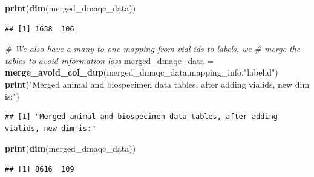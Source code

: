 \documentclass[]{article}
\newenvironment{Shaded}{\begin{snugshade}}{\end{snugshade}}
\newcommand{\KeywordTok}[1]{\textcolor[rgb]{0.13,0.29,0.53}{\textbf{#1}}}
\newcommand{\StringTok}[1]{\textcolor[rgb]{0.31,0.60,0.02}{#1}}
\newcommand{\CommentTok}[1]{\textcolor[rgb]{0.56,0.35,0.01}{\textit{#1}}}
\newcommand{\NormalTok}[1]{#1}
\begin{document}
\begin{Shaded}
\begin{Highlighting}[]
\KeywordTok{print}\NormalTok{(}\KeywordTok{dim}\NormalTok{(merged_dmaqc_data))}
\end{Highlighting}
\end{Shaded}

\begin{verbatim}
## [1] 1638  106
\end{verbatim}

\begin{Shaded}
\begin{Highlighting}[]
\CommentTok{# We also have a many to one mapping from vial ids to labels, we }
\CommentTok{# merge the tables to avoid information loss}
\NormalTok{merged_dmaqc_data =}\StringTok{ }\KeywordTok{merge_avoid_col_dup}\NormalTok{(merged_dmaqc_data,mapping_info,}\StringTok{"labelid"}\NormalTok{)}
\KeywordTok{print}\NormalTok{(}\StringTok{"Merged animal and biospecimen data tables, after adding vialids, new dim is:"}\NormalTok{)}
\end{Highlighting}
\end{Shaded}

\begin{verbatim}
## [1] "Merged animal and biospecimen data tables, after adding vialids, new dim is:"
\end{verbatim}

\begin{Shaded}
\begin{Highlighting}[]
\KeywordTok{print}\NormalTok{(}\KeywordTok{dim}\NormalTok{(merged_dmaqc_data))}
\end{Highlighting}
\end{Shaded}

\begin{verbatim}
## [1] 8616  109
\end{verbatim}
\end{document}
